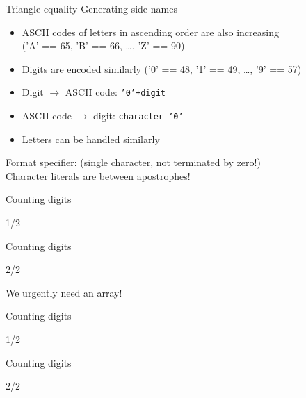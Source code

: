 \documentclass[usenames,dvipsnames,aspectratio=169]{beamer}
\begin{document}
\begin{frame}[fragile]{Triangle equality}
  Generating side names
  \begin{itemize}
    \item ASCII codes of letters in ascending order are also increasing \\ ('A' == 65, 'B' == 66, 
\dots, 'Z' == 90)
    \item Digits are encoded similarly ('0' == 48, '1' == 49, \dots, '9' == 57)
    \item Digit $\rightarrow$ ASCII code: \texttt{'0'+digit}
    \item ASCII code $\rightarrow$ digit: \texttt{character-'0'}
    \item Letters can be handled similarly
  \end{itemize}
  \begin{exampleblock}{}
    \tiny
    
  \end{exampleblock}
  Format specifier:  (single character, not terminated by zero!)\\
  Character literals are between apostrophes!
\end{frame}

\begin{frame}{Counting digits}
    \begin{exampleblock}{ 1/2}
    \tiny
    
  \end{exampleblock}
\end{frame}

\begin{frame}{Counting digits}
    \begin{exampleblock}{ 2/2}
    \scriptsize
    
  \end{exampleblock}
  \vfill
  We urgently need an array!
\end{frame}

\begin{frame}{Counting digits}
    \begin{exampleblock}{ 1/2}
    \footnotesize
    
  \end{exampleblock}
\end{frame}

\begin{frame}{Counting digits}
    \begin{exampleblock}{ 2/2}
    \scriptsize
    
  \end{exampleblock}
\end{frame}
\end{document}
